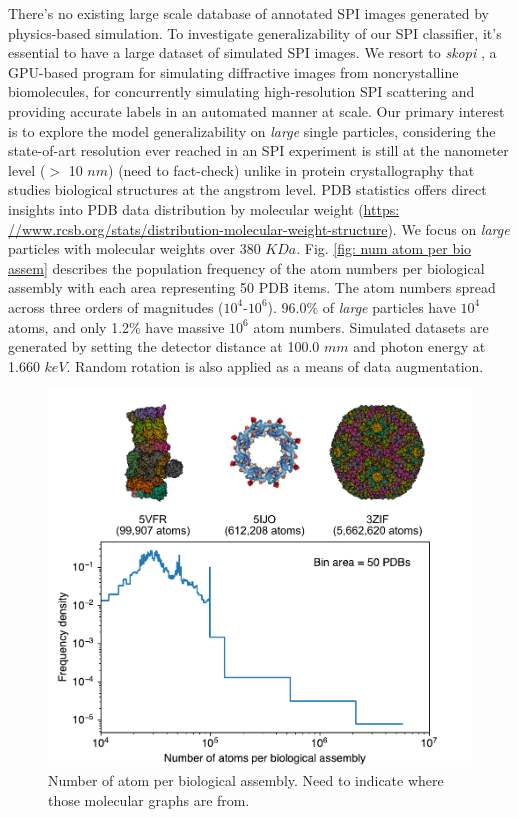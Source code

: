 There's no existing large scale database of annotated SPI images generated by
physics-based simulation.  To investigate generalizability of our SPI classifier,
it's essential to have a large dataset of simulated SPI images. We resort to
\textit{skopi} \cite{peckSkopiSimulationPackage2021}, a GPU-based program for
simulating diffractive images from noncrystalline biomolecules, for concurrently
simulating high-resolution SPI scattering and providing accurate labels in an
automated manner at scale.  Our primary interest is to explore the model
generalizability on \textit{large} single particles, considering the
state-of-art resolution ever reached in an SPI experiment is still at the
nanometer level ($>$ 10 $nm$) {\color{red} (need to fact-check)} unlike in
protein crystallography that studies biological structures at the angstrom
level.  PDB statistics offers direct insights into PDB data distribution by
molecular weight (\url{https:
//www.rcsb.org/stats/distribution-molecular-weight-structure}).  We focus on
\textit{large} particles with molecular weights over 380 $KDa$.  Fig. \ref{fig:
num atom per bio assem} describes the population frequency of the atom numbers
per biological assembly with each area representing 50 PDB items.  The atom
numbers spread across three orders of magnitudes ($10^4\text{-}10^6$).  96.0\%
of \textit{large} particles have $10^4$ atoms, and only 1.2\% have massive
$10^6$ atom numbers. Simulated datasets are generated by setting the detector
distance at 100.0 $mm$ and photon energy at 1.660 $keV$.  Random rotation is
also applied as a means of data augmentation.  

\begin{figure}
\includegraphics[width=1.0\textwidth,keepaspectratio]
{./figures/num_atom_per_bio_assem.pdf}
\caption{Number of atom per biological assembly. {\color{red} Need to indicate where
those molecular graphs are from.}}
\label{fig: num atom per bio assem}
\end{figure}


